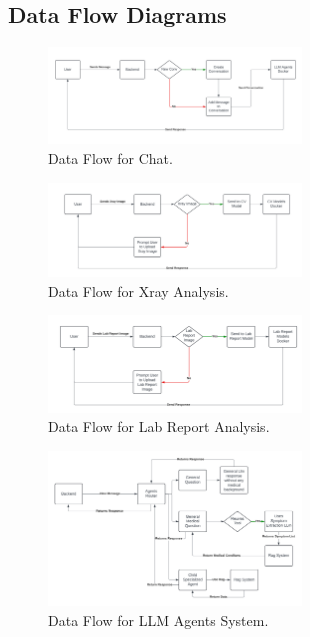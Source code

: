\clearpage



\subsection{Data Flow Diagrams}

\begin{figure}[H]
    \centering
    \includegraphics[width=0.6\textwidth]{./Figures/Dataflow Chat.png}
    \caption{Data Flow for Chat.}
    \label{fig:dataflow-chat}
\end{figure}

\begin{figure}[H]
    \centering
    \includegraphics[width=0.6\textwidth]{./Figures/Dataflow Xray.png}
    \caption{Data Flow for Xray Analysis.}
    \label{fig:dataflow-xray}
\end{figure}

\begin{figure}[H]
    \centering
    \includegraphics[width=0.6\textwidth]{./Figures/Dataflow Lab Report.png}
    \caption{Data Flow for Lab Report Analysis.}
    \label{fig:dataflow-lab-report}
\end{figure}

\begin{figure}[H]
    \centering
    \includegraphics[width=0.6\textwidth]{./Figures/Dataflow Agents System.png}
    \caption{Data Flow for LLM Agents System.}
    \label{fig:dataflow-agents-system}
\end{figure}

